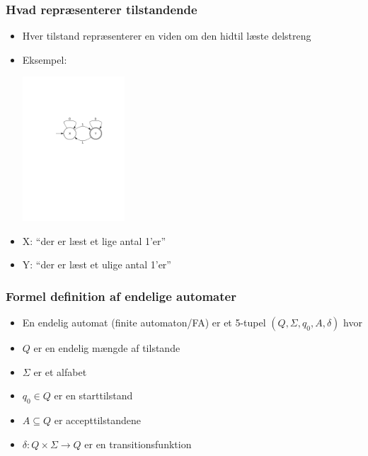 \documentclass[]{beamer}
\begin{document}
\begin{frame}
  \frametitle{Hvad repræsenterer tilstandende}
  \begin{itemize}
  \item  Hver tilstand repræsenterer en viden om den hidtil
læste delstreng
\item Eksempel:
\begin{center}
  \includegraphics[width=0.3\textwidth]{images/1_seminar_odd_num_ones}
\end{center}
\item X: “der er læst et lige antal 1’er”
\item Y: “der er læst et ulige antal 1’er”

  \end{itemize}
\end{frame}

\begin{frame}
\frametitle{Formel definition af endelige automater}
\begin{itemize}
\item  En endelig automat (finite automaton/FA) er
et 5-tupel $(Q, Σ, q_0, A, δ)$ hvor
\item $Q$ er en endelig mængde af tilstande
\item $Σ$ er et alfabet
\item $q_0∈Q$ er en starttilstand
\item $A⊆Q$ er accepttilstandene
\item $δ: Q×Σ→Q$ er en transitionsfunktion
\end{itemize}
\end{frame}
\end{document}
